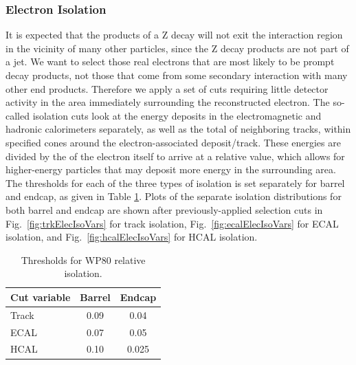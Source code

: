 \subsubsection{Electron Isolation}
\label{evSel:isol}
It is expected that the products of a Z decay will not 
exit the interaction region  
in the vicinity of many other particles, 
since the Z decay products are not part of a jet.
We want to select those real electrons that are most likely to be prompt decay products,
not those that come from some secondary interaction with many other end products.  
Therefore we apply a set of cuts requiring little detector activity 
in the area immediately surrounding the reconstructed electron.  
The so-called isolation cuts look at the energy deposits 
in the electromagnetic and hadronic calorimeters separately,
as well as the total \pt of neighboring tracks, 
within specified \DR cones around the electron-associated deposit/track.  
These energies are divided by the \pt of the electron itself to arrive at a relative value,
which allows for higher-energy particles that may deposit more energy in the surrounding area.  
The thresholds for each of the three types of isolation is set separately for barrel and endcap, 
as given in Table \ref{TableEisoCuts}.  
Plots of the separate isolation distributions for both barrel and endcap 
are shown after previously-applied selection cuts in 
Fig.~\ref{fig:trkElecIsoVars} for track isolation, 
Fig.~\ref{fig:ecalElecIsoVars} for ECAL isolation, and 
Fig.~\ref{fig:hcalElecIsoVars} for HCAL isolation.  




\begin{table}[htbp]
  \begin{center}
    \caption{Thresholds for WP80 relative isolation.}
    \label{TableEisoCuts}
    \begin{tabular}[]{ | l | c | c | }
      \hline
      Cut variable & Barrel & Endcap  \\ \hline \hline
      Track & 0.09 & 0.04 \\ \hline
      ECAL & 0.07 & 0.05  \\ \hline
      HCAL & 0.10 & 0.025  \\ %
      \hline
    \end{tabular}
  \end{center}
\end{table}


